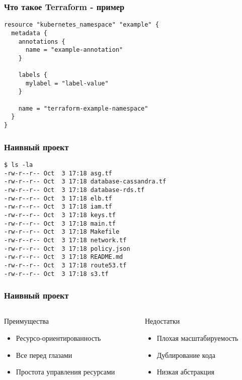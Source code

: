 \documentclass[mathserif,serif]{beamer}
\begin{document}
\begin{frame}[fragile]
	\frametitle{Что такое Terraform - пример}
	\begin{verbatim}
resource "kubernetes_namespace" "example" {
  metadata {
    annotations {
      name = "example-annotation"
    }

    labels {
      mylabel = "label-value"
    }

    name = "terraform-example-namespace"
  }
}
	\end{verbatim}
\end{frame}


\begin{frame}[fragile]
	\frametitle{Наивный проект}
	\begin{verbatim}
$ ls -la
-rw-r--r-- Oct  3 17:18 asg.tf
-rw-r--r-- Oct  3 17:18 database-cassandra.tf
-rw-r--r-- Oct  3 17:18 database-rds.tf
-rw-r--r-- Oct  3 17:18 elb.tf
-rw-r--r-- Oct  3 17:18 iam.tf
-rw-r--r-- Oct  3 17:18 keys.tf
-rw-r--r-- Oct  3 17:18 main.tf
-rw-r--r-- Oct  3 17:18 Makefile
-rw-r--r-- Oct  3 17:18 network.tf
-rw-r--r-- Oct  3 17:18 policy.json
-rw-r--r-- Oct  3 17:18 README.md
-rw-r--r-- Oct  3 17:18 route53.tf
-rw-r--r-- Oct  3 17:18 s3.tf
	\end{verbatim}
\end{frame}

\begin{frame}
	\frametitle{Наивный проект}
	\begin{columns}[T]
		\begin{column}{.5\linewidth}
			\begin{minipage}[c][\textheight][c]{\linewidth}
          			Преимущества
				\begin{itemize}
					\item{Ресурсо-ориентированность}
					\item{Все перед глазами}
					\item{Простота управления ресурсами}
				\end{itemize}
			\end{minipage}
		\end{column}
		\begin{column}{.5\linewidth}
			\begin{minipage}[c][\textheight][c]{\linewidth}
          			Недостатки
				\begin{itemize}
					\item{Плохая масштабируемость}
					\item{Дублирование кода}
					\item{Низкая абстракция}
				\end{itemize}
			\end{minipage}
		\end{column}
	\end{columns}
\end{frame}
\end{document}
